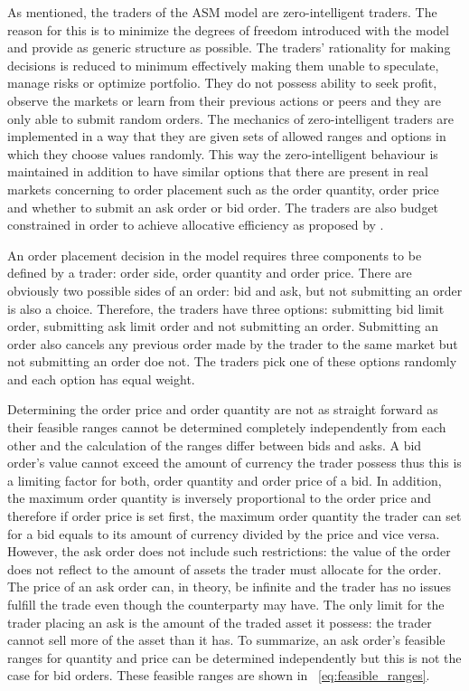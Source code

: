 As mentioned, the traders of the ASM model are zero-intelligent
traders. The reason for this is to minimize the degrees of freedom introduced with
the model and provide as generic structure as possible. The traders' rationality 
for making decisions is reduced to minimum effectively making them unable to speculate, 
manage risks or optimize portfolio. They do not possess ability to seek profit, 
observe the markets or learn from their previous actions or peers and
they are only able to submit random orders. The mechanics of zero-intelligent traders
are implemented in a way that they are given sets of allowed ranges 
and options in which they choose values randomly. This way the zero-intelligent behaviour is maintained
in addition to have similar options that there are present in real markets 
concerning to order placement such as the order quantity, order price and whether
to submit an ask order or bid order. The traders are also budget constrained
in order to achieve allocative efficiency as proposed by
\citet{God93}.


An order placement decision in the model requires three components 
to be defined by a trader: order side, order quantity and order price. 
There are obviously two possible sides of an order: bid and ask, but
not submitting an order is also a choice. Therefore, the traders
have three options: submitting bid limit order, submitting ask limit order
and not submitting an order. Submitting an order also cancels any previous
order made by the trader to the same market but not submitting an order doe not. 
The traders pick one of these options randomly and each option has equal weight. 

Determining the order price and order quantity are not as straight
forward as their feasible ranges cannot be determined completely independently
from each other and the calculation of the ranges differ between bids and asks. A bid order's
value cannot exceed the amount of currency the trader possess thus this is 
a limiting factor for both, order quantity and order price of a bid. In addition,
the maximum order quantity is inversely proportional to the order price and
therefore if order price is set first, the maximum order quantity the trader
can set for a bid equals to its amount of currency divided by the price and vice versa. 
However, the ask order does not include such restrictions: the value of the order
does not reflect to the amount of assets the trader must allocate for the order. The
price of an ask order can, in theory, be infinite and the trader has no issues
fulfill the trade even though the counterparty may have. The only limit for the
trader placing an ask is the amount of the traded asset it possess: the trader
cannot sell more of the asset than it has. To summarize, an ask order's feasible
ranges for quantity and price can be determined independently but this is not the
case for bid orders. These feasible ranges are shown in ~\ref{eq:feasible_ranges}.

